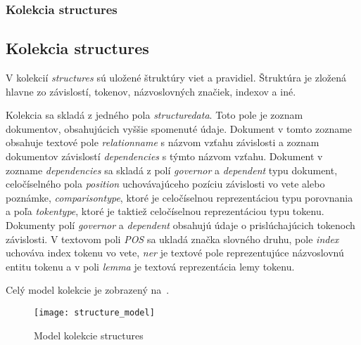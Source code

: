 %
%
{
	\subsubsection{Kolekcia structures}
}
{
	\subsection{Kolekcia structures}
}
\label{subsubsection:collection_structures}
V kolekcií \textit{structures} sú uložené štruktúry viet a pravidiel. Štruktúra je zložená hlavne zo závislostí, tokenov, názvoslovných značiek, indexov a iné.

Kolekcia sa skladá z jedného pola \textit{structure\textunderscore data}. Toto pole je zoznam dokumentov, obsahujúcich vyššie spomenuté údaje. Dokument v tomto zozname obsahuje textové pole \textit{relation\textunderscore name} s názvom vzťahu závislosti a zoznam dokumentov závislostí \textit{dependencies} s týmto názvom vzťahu. Dokument v zozname \textit{dependencies} sa skladá z polí \textit{governor} a \textit{dependent} typu dokument, celočíselného pola \textit{position} uchovávajúceho pozíciu závislosti vo vete alebo poznámke, \textit{comparison\textunderscore type}, ktoré je celočíselnou reprezentáciou typu porovnania a poľa \textit{token\textunderscore type}, ktoré je taktiež celočíselnou reprezentáciou typu tokenu. Dokumenty polí \textit{governor} a \textit{dependent} obsahujú údaje o prislúchajúcich tokenoch závislosti. V textovom poli \textit{POS} sa ukladá značka slovného druhu, pole \textit{index} uchováva index tokenu vo vete, \textit{ner} je textové pole reprezentujúce názvoslovnú entitu tokenu a v poli \textit{lemma} je textová reprezentácia lemy tokenu.

Celý model kolekcie je zobrazený na~.

\begin{figure}[H]
	\begin{center}\texttt{[image: structure\_model]}\end{center}
	\caption[Model kolekcie structures]{Model kolekcie structures}\label{fig:structures_collection_model}
\end{figure}

